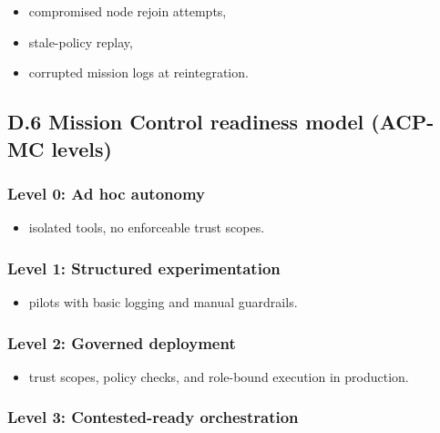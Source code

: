 \documentclass[
]{article}
\providecommand{\tightlist}{%
  \setlength{\itemsep}{0pt}\setlength{\parskip}{0pt}}
\begin{document}
\begin{itemize}
\tightlist
\item
  compromised node rejoin attempts,
\item
  stale-policy replay,
\item
  corrupted mission logs at reintegration.
\end{itemize}

\hypertarget{d.6-mission-control-readiness-model-acp-mc-levels}{%
\subsection{D.6 Mission Control readiness model (ACP-MC
levels)}\label{d.6-mission-control-readiness-model-acp-mc-levels}}

\hypertarget{level-0-ad-hoc-autonomy}{%
\subsubsection{Level 0: Ad hoc autonomy}\label{level-0-ad-hoc-autonomy}}

\begin{itemize}
\tightlist
\item
  isolated tools, no enforceable trust scopes.
\end{itemize}

\hypertarget{level-1-structured-experimentation}{%
\subsubsection{Level 1: Structured
experimentation}\label{level-1-structured-experimentation}}

\begin{itemize}
\tightlist
\item
  pilots with basic logging and manual guardrails.
\end{itemize}

\hypertarget{level-2-governed-deployment}{%
\subsubsection{Level 2: Governed
deployment}\label{level-2-governed-deployment}}

\begin{itemize}
\tightlist
\item
  trust scopes, policy checks, and role-bound execution in production.
\end{itemize}

\hypertarget{level-3-contested-ready-orchestration}{%
\subsubsection{Level 3: Contested-ready
orchestration}\label{level-3-contested-ready-orchestration}}
\end{document}
